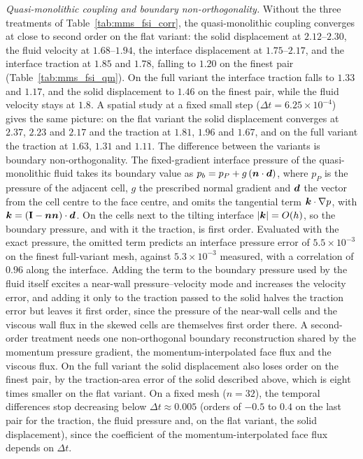 \emph{Quasi-monolithic coupling and boundary non-orthogonality.}
Without the three treatments of Table~\ref{tab:mms_fsi_corr}, the quasi-monolithic coupling converges at close to second order on the flat variant: the solid displacement at $2.12$--$2.30$, the fluid velocity at $1.68$--$1.94$, the interface displacement at $1.75$--$2.17$, and the interface traction at $1.85$ and $1.78$, falling to $1.20$ on the finest pair (Table~\ref{tab:mms_fsi_qm}).
On the full variant the interface traction falls to $1.33$ and $1.17$, and the solid displacement to $1.46$ on the finest pair, while the fluid velocity stays at $1.8$.
A spatial study at a fixed small step ($\Delta t = 6.25\times10^{-4}$) gives the same picture: on the flat variant the solid displacement converges at $2.37$, $2.23$ and $2.17$ and the traction at $1.81$, $1.96$ and $1.67$, and on the full variant the traction at $1.63$, $1.31$ and $1.11$.
The difference between the variants is boundary non-orthogonality.
The fixed-gradient interface pressure of the quasi-monolithic fluid takes its boundary value as $p_b = p_P + g\,(\boldsymbol{n}\cdot\boldsymbol{d})$, where $p_P$ is the pressure of the adjacent cell, $g$ the prescribed normal gradient and $\boldsymbol{d}$ the vector from the cell centre to the face centre, and omits the tangential term $\boldsymbol{k}\cdot\nabla p$, with $\boldsymbol{k} = (\mathbf{I} - \boldsymbol{n}\boldsymbol{n})\cdot\boldsymbol{d}$.
On the cells next to the tilting interface $|\boldsymbol{k}| = O(h)$, so the boundary pressure, and with it the traction, is first order.
Evaluated with the exact pressure, the omitted term predicts an interface pressure error of $5.5\times10^{-3}$ on the finest full-variant mesh, against $5.3\times10^{-3}$ measured, with a correlation of $0.96$ along the interface.
Adding the term to the boundary pressure used by the fluid itself excites a near-wall pressure--velocity mode and increases the velocity error, and adding it only to the traction passed to the solid halves the traction error but leaves it first order, since the pressure of the near-wall cells and the viscous wall flux in the skewed cells are themselves first order there.
A second-order treatment needs one non-orthogonal boundary reconstruction shared by the momentum pressure gradient, the momentum-interpolated face flux and the viscous flux.
On the full variant the solid displacement also loses order on the finest pair, by the traction-area error of the solid described above, which is eight times smaller on the flat variant.
On a fixed mesh ($n = 32$), the temporal differences stop decreasing below $\Delta t \approx 0.005$ (orders of $-0.5$ to $0.4$ on the last pair for the traction, the fluid pressure and, on the flat variant, the solid displacement), since the coefficient of the momentum-interpolated face flux depends on $\Delta t$.
